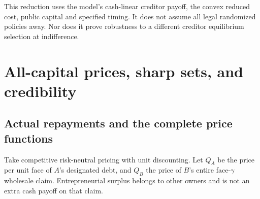 \documentclass[11pt,a4paper]{article}
\numberwithin{equation}{section}
\theoremstyle{definition}
\begin{document}
This reduction uses the model's cash-linear creditor payoff, the convex
reduced cost, public capital and specified timing. It does not assume
all legal randomized policies away. Nor does it prove robustness to a
different creditor equilibrium selection at indifference.

\section{All-capital prices, sharp sets, and credibility}\label{sec:prices}

\subsection{Actual repayments and the complete price functions}
Take competitive risk-neutral pricing with unit discounting. Let \(Q_A\)
be the price per unit face of \(A\)'s designated debt, and \(Q_B\) the
price of \(B\)'s entire face-\(\gamma\) wholesale claim. Entrepreneurial
surplus belongs to other owners and is not an extra cash payoff on that
claim.
\end{document}
